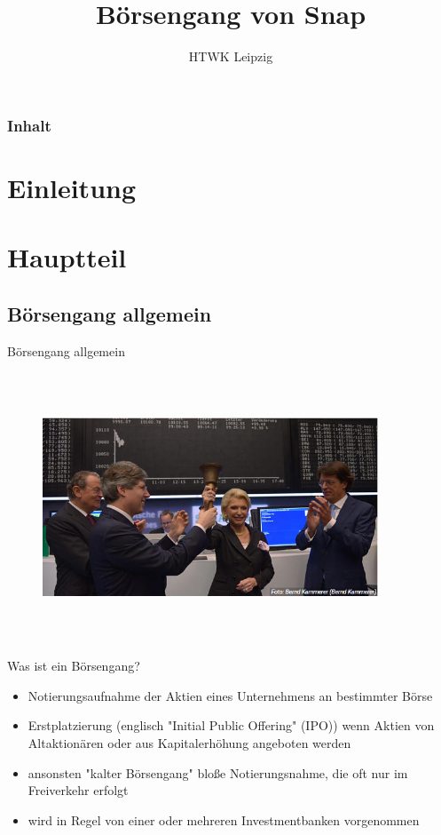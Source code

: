 \documentclass{beamer}
\title{Börsengang von Snap}
\institute{Alex Dudin, Hendrik Schick, Andre Hildebrandt}
\author[]{HTWK Leipzig} %
\begin{document}
\begin{frame}
\titlepage
\end{frame}

\begin{frame}
\frametitle{Inhalt}
\tableofcontents
\end{frame}

\section{Einleitung}




\section{Hauptteil}


\subsection{Börsengang allgemein}

\begin{frame} {Börsengang allgemein}
\begin{figure}
	\centering
	\includegraphics[width=10cm, height=8cm]{boersenglockeeinfuehrung.PNG}
\end{figure}
\end{frame}

\begin{frame} {Was ist ein Börsengang?}
\begin{itemize}
\item Notierungsaufnahme der Aktien eines Unternehmens an bestimmter Börse 
\item Erstplatzierung (englisch "Initial Public Offering" (IPO)) wenn Aktien von Altaktionären oder aus Kapitalerhöhung angeboten werden
\item ansonsten "kalter Börsengang" bloße Notierungsnahme, die oft nur im Freiverkehr erfolgt
\item wird in Regel von einer oder mehreren Investmentbanken vorgenommen
\end{itemize}
\end{frame}
\end{document}
